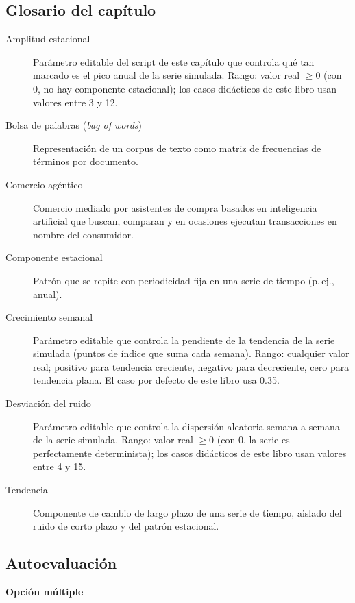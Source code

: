 \subsection*{Glosario del capítulo}
\begin{description}
  \item[Amplitud estacional] Parámetro editable del script de este capítulo
  que controla qué tan marcado es el pico anual de la serie simulada. Rango:
  valor real $\geq 0$ (con 0, no hay componente estacional); los casos
  didácticos de este libro usan valores entre 3 y 12.
  \item[Bolsa de palabras (\textit{bag of words})] Representación de un
  corpus de texto como matriz de frecuencias de términos por documento.
  \item[Comercio agéntico] Comercio mediado por asistentes de compra basados
  en inteligencia artificial que buscan, comparan y en ocasiones ejecutan
  transacciones en nombre del consumidor.
  \item[Componente estacional] Patrón que se repite con periodicidad fija en
  una serie de tiempo (p.\,ej., anual).
  \item[Crecimiento semanal] Parámetro editable que controla la pendiente de
  la tendencia de la serie simulada (puntos de índice que suma cada semana).
  Rango: cualquier valor real; positivo para tendencia creciente, negativo
  para decreciente, cero para tendencia plana. El caso por defecto de este
  libro usa 0.35.
  \item[Desviación del ruido] Parámetro editable que controla la dispersión
  aleatoria semana a semana de la serie simulada. Rango: valor real $\geq 0$
  (con 0, la serie es perfectamente determinista); los casos didácticos de
  este libro usan valores entre 4 y 15.
  \item[Tendencia] Componente de cambio de largo plazo de una serie de
  tiempo, aislado del ruido de corto plazo y del patrón estacional.
\end{description}

\subsection*{Autoevaluación}

\textbf{Opción múltiple}

